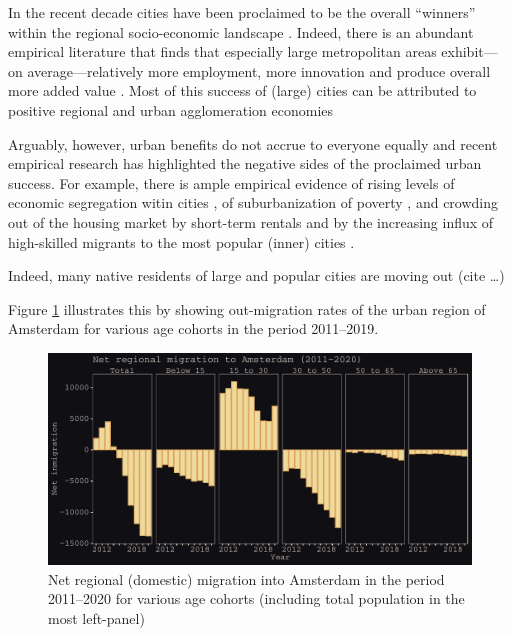 \documentclass[a4paper,fleqn]{cas-dc}
\begin{document}
In the recent decade cities have been proclaimed to be the overall ``winners''
within the regional socio-economic landscape \citep[]{glaeser2012triumph}.
Indeed, there is an abundant empirical literature that finds that especially
large metropolitan areas exhibit---on average---relatively more employment, more
innovation and produce overall more added value \citep[see,
e.g.,][]{balland2020complex}. Most of this success of (large) cities can be
attributed to positive regional and urban agglomeration economies \citep[see for
recent overviews of the size, scope and nature of these urban
economies][]{melo2009meta, duranton2020, rosenthal2020}

Arguably, however, urban benefits do not accrue to everyone equally and recent
empirical research has highlighted the negative sides of the proclaimed urban
success. For example, there is ample empirical evidence of rising levels of
economic segregation witin cities \citep{tammaru2015socio}, of suburbanization
of poverty \citep{hochstenbach2018gentrification}, and crowding out of the
housing market by short-term rentals \citep{koster2018short} and by the
increasing influx of high-skilled migrants to the most popular (inner) cities
\citep{beckers2019residential}.

Indeed, many native residents of large and popular cities are moving out (cite \dots)

Figure \ref{fig:adam_mig} illustrates this by showing out-migration rates of the
urban region of Amsterdam for
various age cohorts in the period 2011--2019. 

\begin{figure}[h!]\centering %
 \includegraphics[width=1\linewidth]{../../fig/outmig_amsterdam.pdf}
 \caption{Net regional (domestic) migration into Amsterdam in the period 2011--2020 for
   various age cohorts (including total population in the most left-panel)}
  \label{fig:adam_mig}
\end{figure}
\end{document}
